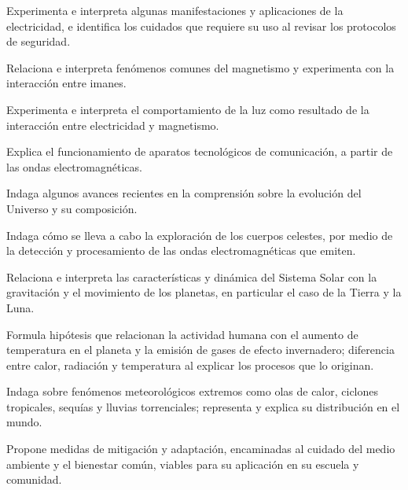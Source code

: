 \item Experimenta e interpreta algunas manifestaciones y aplicaciones de la electricidad, e identifica los cuidados que requiere su uso al revisar los protocolos de seguridad.
\item Relaciona e interpreta fenómenos comunes del magnetismo y experimenta con la interacción entre imanes.
\item Experimenta e interpreta el comportamiento de la luz como resultado de la interacción entre electricidad y magnetismo.
\item Explica el funcionamiento de aparatos tecnológicos de comunicación, a partir de las ondas electromagnéticas.
\item Indaga algunos avances recientes en la comprensión sobre la evolución del Universo y su composición.
\item Indaga cómo se lleva a cabo la exploración de los cuerpos celestes, por medio de la detección y procesamiento de las ondas electromagnéticas que emiten.
\item Relaciona e interpreta las características y dinámica del Sistema Solar con la gravitación y el movimiento de los planetas, en particular el caso de la Tierra y la Luna.
\item Formula hipótesis que relacionan la actividad humana con el aumento de temperatura en el planeta y la emisión de gases de efecto invernadero; diferencia entre calor, radiación y temperatura al explicar los procesos que lo originan.
\item Indaga sobre fenómenos meteorológicos extremos como olas de calor, ciclones tropicales, sequías y lluvias torrenciales; representa y explica su distribución en el mundo.
\item Propone medidas de mitigación y adaptación, encaminadas al cuidado del medio ambiente y el bienestar común, viables para su aplicación en su escuela y comunidad.